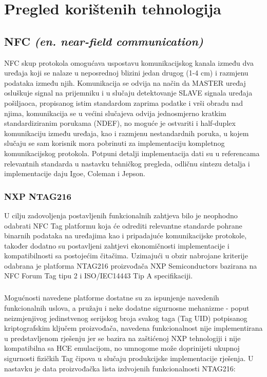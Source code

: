 \chapter{Pregled korištenih tehnologija} \label{chapter:tech}

\section{NFC \textit{(en. near-field communication)}}
NFC skup protokola omogućava uspostavu komunikacijskog kanala između dva uređaja koji se nalaze u neposrednoj blizini jedan drugog (1-4 cm) i razmjenu podataka između njih\cite{NFCProtocol}. Komunikacija se odvija na način da MASTER uređaj osluškuje signal na prijemniku i u slučaju detektovanje SLAVE signala uređaja pošiljaoca, propisanog istim standardom zaprima podatke i vrši obradu nad njima, komunikacija se u većini slučajeva odvija jednosmjerno kratkim standardiziranim porukama (NDEF), no moguće je ostvariti i half-duplex komunikaciju između uređaja, kao i razmjenu nestandardnih poruka, u kojem slučaju se sam korisnik mora pobrinuti za implementaciju kompletnog komunikacijskog protokola. Potpuni detalji implementacija dati su u referencama relevantnih standarda u nastavku tehničkog pregleda, odličnu sintezu detalja i implementacije daju Igoe, Coleman i Jepson\cite{Igoe2014}.
\subsection{NXP NTAG216}
U cilju zadovoljenja postavljenih funkcionalnih zahtjeva bilo je neophodno odabrati NFC Tag platformu koja će odrediti relevantne standarde pohrane binarnih podataka na uređajima kao i pripadajuće komunikacijske protokole, također dodatno su postavljeni zahtjevi ekonomičnosti implementacije i kompatibilnosti sa postojećim čitačima. Uzimajući u obzir nabrojane kriterije odabrana je platforma NTAG216 proizvođača NXP Semiconductors\cite{NTAG216} bazirana na NFC Forum Tag tipu 2 i ISO/IEC14443 Tip A specifikaciji\cite{NFCTag2}\cite{ISO14443}. 

\paragraph*{}
Mogućnosti navedene platforme dostatne su za ispunjenje navedenih funkcionalnih uslova, a pružaju i neke dodatne sigurnosne mehanizme - poput neizmjenjivog jedinstvenog serijskog broja svakog taga (Tag UID) potpisanog kriptografskim ključem proizvođača, navedena funkcionalnost nije implementirana u predstavljenom rješenju jer se bazira na zaštićenoj NXP tehnologiji i nije kompatibilna sa HCE emulacijom, no umnogome može doprinijeti ukupnoj sigurnosti fizičkih Tag čipova u slučaju produkcijske implementacije rješenja. U nastavku je data proizvođačka lista izdvojenih funkcionalnosti NTAG216:

